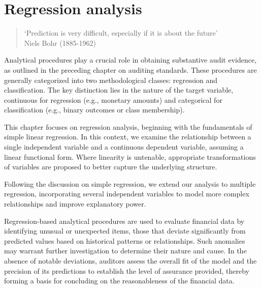 
\chapter{Regression analysis}
\label{cha:introduction_to_regression_analysis}

\raggedbottom



\begin{quote}
`Prediction is very difficult, especially if it is about the future'\\
Niels Bohr (1885-1962)
\end{quote}

Analytical procedures play a crucial role in obtaining substantive audit evidence, as outlined in the preceding chapter on auditing standards. 
These procedures are generally categorized into two methodological classes: regression and classification. 
The key distinction lies in the nature of the target variable, continuous for regression (e.g., monetary amounts) and categorical for classification (e.g., binary outcomes or class membership).

This chapter focuses on regression analysis, beginning with the fundamentals of simple linear regression. 
In this context, we examine the relationship between a single independent variable and a continuous dependent variable, assuming a linear functional form. 
Where linearity is untenable, appropriate transformations of variables are proposed to better capture the underlying structure.

Following the discussion on simple regression, we extend our analysis to multiple regression, incorporating several independent variables to model more complex relationships and improve explanatory power.

Regression-based analytical procedures are used to evaluate financial data by identifying unusual or unexpected items, those that deviate significantly from predicted values based on historical patterns or relationships. 
Such anomalies may warrant further investigation to determine their nature and cause. 
In the absence of notable deviations, auditors assess the overall fit of the model and the precision of its predictions to establish the level of assurance provided, thereby forming a basis for concluding on the reasonableness of the financial data.




